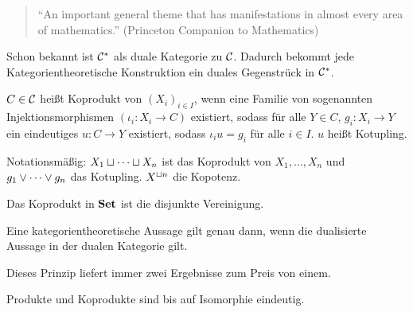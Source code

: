 \documentclass{book}
\begin{document}
\begin{quotation}
    ``An important general theme that has manifestations in almost every area of mathematics.'' (Princeton Companion to Mathematics)
\end{quotation}

Schon bekannt ist $\mathcal{C}^{\ast}$ als duale Kategorie zu $\mathcal{C}$. Dadurch bekommt jede Kategorientheoretische Konstruktion ein duales Gegenstrück in $\mathcal{C}^{\ast}$.

\begin{definition}
    $C\in\mathcal{C}$ heißt Koprodukt von ${(X_i)}_{i\in I}$, wenn eine Familie von sogenannten Injektionsmorphismen $(\iota_i:X_i\to C)$ existiert, sodass für alle $Y\in C$, $g_i:X_i\to Y$ ein eindeutiges $u:C\to Y$ existiert, sodass $\iota_i u = g_i$ für alle $i\in I$.
    $u$ heißt Kotupling.
\end{definition}

\begin{remark}
    Notationsmäßig: $X_1\mathbin{\sqcup}\cdots\mathbin{\sqcup} X_n$ ist das Koprodukt von $X_1,\ldots,X_n$ und $g_1\vee\cdots\vee g_n$ das Kotupling. $X^{\mathbin{\sqcup} n}$ die Kopotenz.
\end{remark}

\begin{example}
    Das Koprodukt in $\mathbf{Set}$ ist die disjunkte Vereinigung.
\end{example}

\begin{remark}
    Eine kategorientheoretische Aussage gilt genau dann, wenn die dualisierte Aussage in der dualen Kategorie gilt.
\end{remark}

Dieses Prinzip liefert immer zwei Ergebnisse zum Preis von einem.

\begin{example}
    Produkte und Koprodukte sind bis auf Isomorphie eindeutig.
\end{example}
\end{document}
